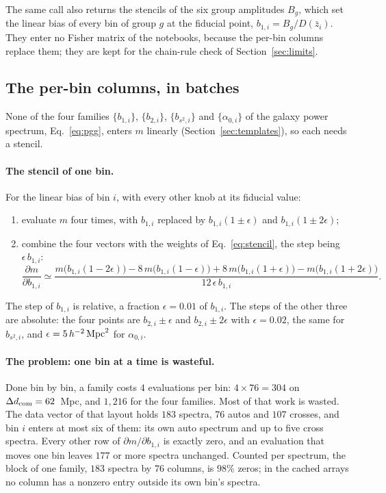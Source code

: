 \documentclass[11pt]{article}
\newcommand{\aunit}{\,h^{-2}\,{\rm Mpc}^2}
\begin{document}
The same call also returns the stencils of the six group amplitudes
$B_g$, which set the linear bias of every bin of group $g$ at the
fiducial point, $b_{1,i} = B_g/D(\bar{z}_i)$.  They enter no Fisher
matrix of the notebooks, because the per-bin columns
replace them; they are kept for the chain-rule check of
Section~\ref{sec:limits}.

\subsection{The per-bin columns, in batches}
\label{sec:operators}

None of the four families $\{b_{1,i}\}$, $\{b_{2,i}\}$, $\{b_{s^2,i}\}$
and $\{\alpha_{0,i}\}$ of the galaxy power spectrum,
Eq.~\eqref{eq:pgg}, enters $m$ linearly
(Section~\ref{sec:templates}), so each needs a stencil.

\paragraph{The stencil of one bin.}
For the linear bias of bin $i$, with every other knob at its fiducial
value:
\begin{enumerate}
  \item evaluate $m$ four times, with $b_{1,i}$ replaced by
    $b_{1,i}(1 \pm \epsilon)$ and $b_{1,i}(1 \pm 2\epsilon)$;
  \item combine the four vectors with the weights of
    Eq.~\eqref{eq:stencil}, the step being $\epsilon\, b_{1,i}$:
    \begin{equation}
      \frac{\partial m}{\partial b_{1,i}} \simeq
      \frac{m\bigl(b_{1,i}(1 - 2\epsilon)\bigr)
        - 8\,m\bigl(b_{1,i}(1 - \epsilon)\bigr)
        + 8\,m\bigl(b_{1,i}(1 + \epsilon)\bigr)
        - m\bigl(b_{1,i}(1 + 2\epsilon)\bigr)}{12\,\epsilon\, b_{1,i}} .
    \end{equation}
\end{enumerate}
The step of $b_{1,i}$ is relative, a fraction $\epsilon = 0.01$ of
$b_{1,i}$.  The steps of the other three are absolute: the four points
are $b_{2,i} \pm \epsilon$ and $b_{2,i} \pm 2\epsilon$ with
$\epsilon = 0.02$, the same for $b_{s^2,i}$, and $\epsilon = 5\aunit$
for $\alpha_{0,i}$.

\paragraph{The problem: one bin at a time is wasteful.}
Done bin by bin, a family costs $4$ evaluations per bin: $4 \times 76 =
304$ on $\Delta d_{\rm com} = 62$~Mpc, and $1{,}216$ for the four
families.  Most of that work is wasted.  The data vector of that layout
holds $183$ spectra, $76$ autos and $107$ crosses, and bin $i$ enters at
most six of them: its own auto spectrum and up to five cross spectra.
Every other row of $\partial m/\partial b_{1,i}$ is exactly zero, and an
evaluation that moves one bin leaves $177$ or more spectra unchanged.
Counted per spectrum, the block of one family, $183$ spectra by $76$
columns, is $98\%$ zeros; in the cached arrays no column has a nonzero
entry outside its own bin's spectra.
\end{document}
